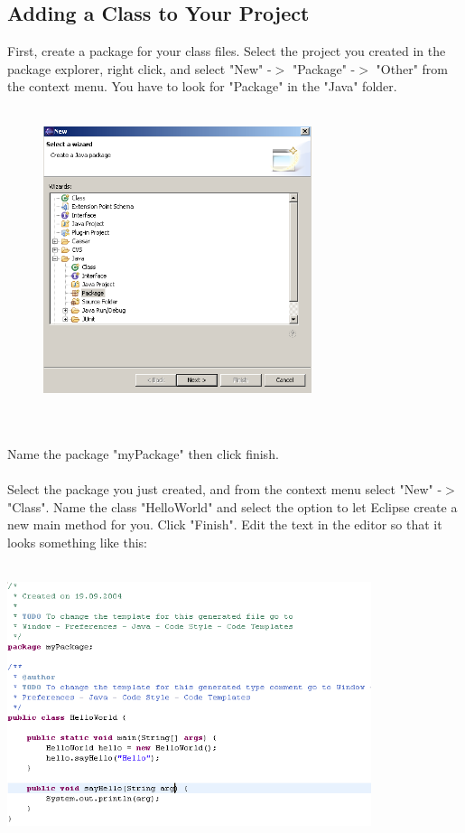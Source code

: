 \subsection{Adding a Class to Your Project}
First, create a package for your class files. Select the project you created in the package explorer, right click, and select
"New" -$>$ "Package" -$>$ "Other" from the context menu. You have to look for "Package" in the "Java" folder.\\\\
\begin{figure}[htbp]
	\centering
		\includegraphics[width=0.70\textwidth]{images/package.png}
	\label{fig:package}
\end{figure}\\\\
Name the package "myPackage" then click finish.\\\\
Select the package you just created, and from the context menu select "New" -$>$ "Class". Name the
class "HelloWorld" and select the option to let Eclipse create a new main method for you. Click "Finish".\newpage
Edit the text in the editor so that it looks something like this:\\\\
\begin{center}
	\includegraphics[width=0.80\textwidth]{images/code.png}
\end{center}
	
